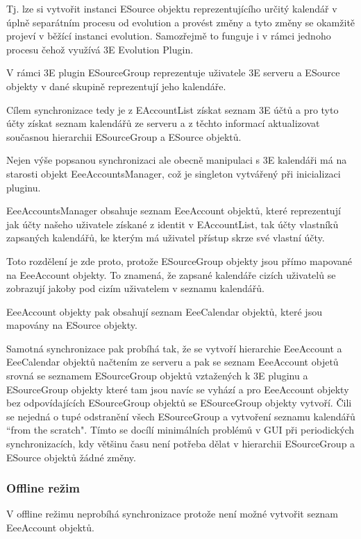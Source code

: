 \documentclass[a4paper,10pt]{article}
\begin{document}
\begin{multicols*}{2}
Tj. lze si vytvořit instanci ESource objektu reprezentujícího určitý kalendář v
úplně separátním procesu od evolution a provést změny a tyto změny se okamžitě
projeví v běžící instanci evolution. Samozřejmě to funguje i v rámci jednoho
procesu čehož využívá 3E Evolution Plugin.

V rámci 3E plugin ESourceGroup reprezentuje uživatele 3E serveru a ESource
objekty v dané skupině reprezentují jeho kalendáře.

Cílem synchronizace tedy je z EAccountList získat seznam 3E účtů a pro tyto účty
získat seznam kalendářů ze serveru a z těchto informací aktualizovat současnou
hierarchii ESourceGroup a ESource objektů.

Nejen výše popsanou synchronizaci ale obecně manipulaci s 3E kalendáři má na
starosti objekt EeeAccountsManager, což je singleton vytvářený při inicializaci
pluginu.

EeeAccountsManager obsahuje seznam EeeAccount objektů, které reprezentují jak
účty našeho uživatele získané z identit v EAccountList, tak účty vlastníků
zapsaných kalendářů, ke kterým má uživatel přístup skrze své vlastní účty.

Toto rozdělení je zde proto, protože ESourceGroup objekty jsou přímo mapované
na EeeAccount objekty. To znamená, že zapsané kalendáře cizích uživatelů se
zobrazují jakoby pod cizím uživatelem v seznamu kalendářů.

EeeAccount objekty pak obsahují seznam EeeCalendar objektů, které jsou mapovány
na ESource objekty.

Samotná synchronizace pak probíhá tak, že se vytvoří hierarchie EeeAccount a
EeeCalendar objektů načtením ze serveru a pak se seznam EeeAccount objetů srovná
se seznamem ESourceGroup objektů vztažených k 3E pluginu a ESourceGroup objekty
které tam jsou navíc se vyhází a pro EeeAccount objekty bez odpovídajících
ESourceGroup objektů se ESourceGroup objekty vytvoří. Čili se nejedná o tupé
odstranění všech ESourceGroup a vytvoření seznamu kalendářů ``from the scratch".
Tímto se docílí minimálních problémů v GUI při periodických synchronizacích,
kdy většinu času není potřeba dělat v hierarchii ESourceGroup a ESource objektů
žádné změny.

\subsubsection{Offline režim}

V offline režimu neprobíhá synchronizace protože není možné vytvořit seznam
EeeAccount objektů.


\end{multicols*}
\end{document}
